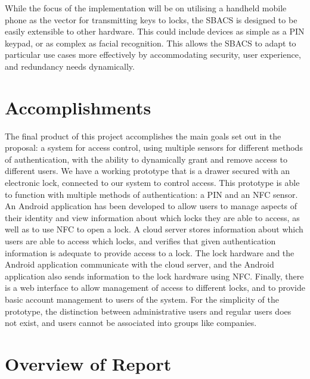 \documentclass[12pt]{report}
\let\Oldsection\section
\renewcommand{\section}{\FloatBarrier\Oldsection}
\begin{document}
While the focus of the implementation will be on utilising a handheld mobile phone as the vector for transmitting keys
to locks, the SBACS is designed to be easily extensible to other hardware. This could include devices as simple as a PIN
keypad, or as complex as facial recognition. This allows the SBACS to adapt to particular use cases more effectively
by accommodating security, user experience, and redundancy needs dynamically.

\section{Accomplishments} \label{accomplishments}

The final product of this project accomplishes the main goals set out in the proposal: a system for access control,
using multiple sensors for different methods of authentication, with the ability to dynamically grant and remove
access to different users. We have a working prototype that is a drawer secured with an electronic lock, connected
to our system to control access. This prototype is able to function with multiple methods of authentication: a PIN
and an NFC sensor. An Android application has been developed to allow users to manage aspects of their identity and
view information about which locks they are able to access, as well as to use NFC to open a lock. A cloud server stores
information about which users are able to access which locks, and verifies that given authentication information is
adequate to provide access to a lock. The lock hardware and the Android application communicate with the cloud server,
and the Android application also sends information to the lock hardware using NFC. Finally, there is a web interface
to allow management of access to different locks, and to provide basic account management to users of the system.
For the simplicity of the prototype, the distinction between administrative users and regular users does not exist, and
users cannot be associated into groups like companies.

\section{Overview of Report} \label{overview-of-report}
\end{document}
